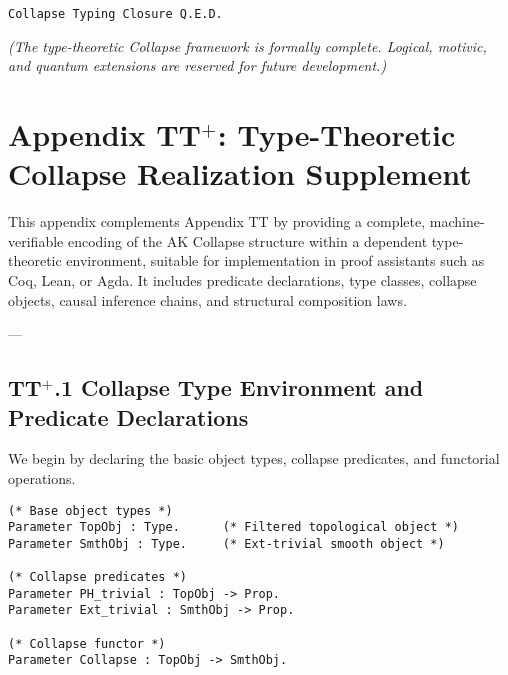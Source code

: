\documentclass[11pt]{article}
\begin{document}
\begin{flushright}
\texttt{\large Collapse Typing Closure \quad Q.E.D.}
\end{flushright}

\begin{center}
\small
\textit{(The type-theoretic Collapse framework is formally complete.  
Logical, motivic, and quantum extensions are reserved for future development.)}
\end{center}




\section*{Appendix TT$^{+}$: Type-Theoretic Collapse Realization Supplement}

This appendix complements Appendix TT by providing a complete, machine-verifiable encoding  
of the AK Collapse structure within a dependent type-theoretic environment, suitable for implementation  
in proof assistants such as Coq, Lean, or Agda. It includes predicate declarations, type classes,  
collapse objects, causal inference chains, and structural composition laws.

---

\subsection*{TT$^{+}$.1 Collapse Type Environment and Predicate Declarations}

We begin by declaring the basic object types, collapse predicates, and functorial operations.

\begin{lstlisting}[language=Coq]
(* Base object types *)
Parameter TopObj : Type.      (* Filtered topological object *)
Parameter SmthObj : Type.     (* Ext-trivial smooth object *)

(* Collapse predicates *)
Parameter PH_trivial : TopObj -> Prop.
Parameter Ext_trivial : SmthObj -> Prop.

(* Collapse functor *)
Parameter Collapse : TopObj -> SmthObj.
\end{lstlisting}
\end{document}
